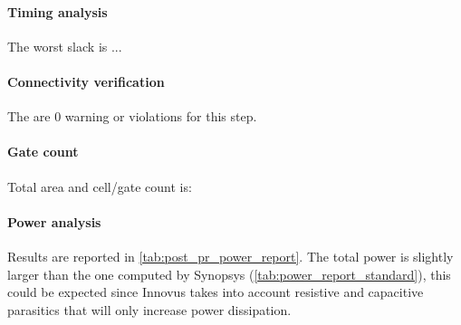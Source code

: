 \paragraph{Timing analysis} The worst slack is ...


\paragraph{Connectivity verification} The are 0 warning or violations for this step.


\paragraph{Gate count} Total area and cell/gate count is:


\paragraph{Power analysis} Results are reported in \autoref{tab:post_pr_power_report}. The total power is slightly larger than the one computed by Synopsys (\autoref{tab:power_report_standard}), this could be expected since Innovus takes into account resistive and capacitive parasitics that will only increase power dissipation.

